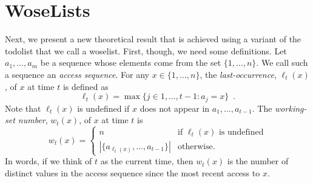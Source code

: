 \documentclass[lotsofwhite]{patmorin}
\begin{document}
%
%

\section{WoseLists}

Next, we present a new theoretical result that is achieved using a
variant of the todolist that we call a woselist.  First, though, we need
some definitions.  Let $a_1,\ldots,a_m$ be a sequence whose elements come
from the set $\{1,\ldots,n\}$.  We call such a sequence an \emph{access
sequence}. For any $x\in\{1,\ldots,n\}$, the \emph{last-occurrence},
$\ell_t(x)$, of $x$ at time $t$ is defined as
\[
   \ell_t(x)=\max\{j\in{1,\ldots,t-1}: a_{j} = x\} \enspace .
\]
Note that $\ell_t(x)$ is undefined if $x$ does not appear in
$a_1,\ldots,a_{t-1}$.  The \emph{working-set number}, $w_t(x)$, of $x$
at time $t$ is
\[
    w_t(x) = \begin{cases}
               n & \text{if $\ell_t(x)$ is undefined} \\
               |\{a_{\ell_t(x)},\ldots,a_{t-1}\}| & \text{otherwise.}
             \end{cases}
\]
In words, if we think of $t$ as the current time, then $w_t(x)$ is the
number of distinct values in the access sequence since the most recent
access to $x$.
\end{document}
